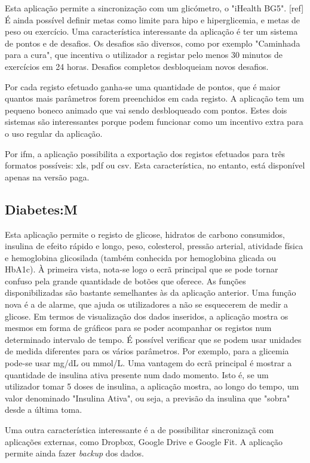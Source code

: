 Esta aplicação permite a sincronização com um glicómetro, o "iHealth BG5". [ref] É ainda possível definir metas como limite para hipo e hiperglicemia, e metas de peso ou exercício. Uma característica interessante da aplicação é ter um sistema de pontos e de desafios. Os desafios são diversos, como por exemplo "Caminhada para a cura", que incentiva o utilizador a registar pelo menos 30 minutos de exercícios em 24 horas. Desafios completos desbloqueiam novos desafios. 

Por cada registo efetuado ganha-se uma quantidade de pontos, que é maior quantos mais parâmetros forem preenchidos em cada registo. A aplicação tem um pequeno boneco animado que vai sendo desbloqueado com pontos. Estes dois sistemas são interessantes porque podem funcionar como um incentivo extra para o uso regular da aplicação. 

Por ifm, a aplicação possibilita a exportação dos registos efetuados para três formatos possíveis: xls, pdf ou csv. Esta característica, no entanto, está disponível apenas na versão paga.

\subsection{Diabetes:M}

Esta aplicação permite o registo de glicose, hidratos de carbono consumidos, insulina de efeito rápido e longo, peso, colesterol, pressão arterial, atividade física e hemoglobina glicosilada (também conhecida por hemoglobina glicada ou HbA1c). À primeira vista, nota-se logo o ecrã principal que se pode tornar confuso pela grande quantidade de botões que oferece. As funções disponibilizadas são bastante semelhantes às da aplicação anterior. Uma função nova é a de alarme, que ajuda os utilizadores a não se esquecerem de medir a glicose. Em termos de visualização dos dados inseridos, a aplicação mostra os mesmos em forma de gráficos para se poder acompanhar os registos num determinado intervalo de tempo. É possível verificar que se podem usar unidades de medida diferentes para os vários parâmetros. Por exemplo, para a glicemia pode-se usar mg/dL ou mmol/L. Uma vantagem do ecrã principal é mostrar a quantidade de insulina ativa presente num dado momento. Isto é, se um utilizador tomar 5 doses de insulina, a aplicação mostra, ao longo do tempo, um valor denominado "Insulina Ativa", ou seja, a previsão da insulina que "sobra" desde a última toma.

Uma outra característica interessante é a de possibilitar sincronizaçã com aplicações externas, como Dropbox, Google Drive e Google Fit. A aplicação permite ainda fazer \textit{backup} dos dados.

